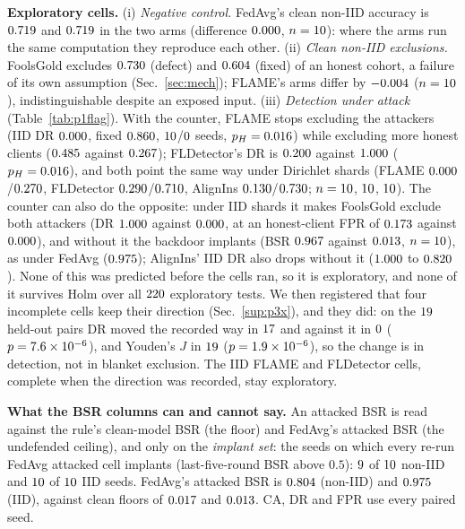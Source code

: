 \documentclass[journal]{IEEEtran}
\begin{document}
\textbf{Exploratory cells.}
(i) \emph{Negative control.} FedAvg's clean non-IID accuracy is
$0.719$ and $0.719$ in the two arms (difference
$0.000$, $n=10$): where the arms run the same
computation they reproduce each other.
(ii) \emph{Clean non-IID exclusions.} FoolsGold excludes $0.730$
(defect) and $0.604$ (fixed) of an honest cohort, a failure of its
own assumption (Sec.~\ref{sec:mech}); FLAME's arms differ by $-0.004$
($n=10$), indistinguishable despite an exposed input.
(iii) \emph{Detection under attack} (Table~\ref{tab:p1flag}). With the counter, FLAME
stops excluding the attackers (IID DR $0.000$, fixed
$0.860$, $10$/$0$ seeds, $p_H=0.016$)
while excluding more honest clients ($0.485$ against
$0.267$); FLDetector's DR is $0.200$ against
$1.000$ ($p_H=0.016$), and both point the same way
under Dirichlet shards (FLAME $0.000$/$0.270$,
FLDetector $0.290$/$0.710$, AlignIns
$0.130$/$0.730$; $n=10$, $10$, $10$). The counter can also do the
opposite: under IID shards it makes FoolsGold exclude both attackers (DR
$1.000$ against $0.000$, at an honest-client FPR of
$0.173$ against $0.000$), and without it the backdoor
implants (BSR $0.967$ against $0.013$,
$n=10$), as under FedAvg ($0.975$); AlignIns' IID DR
also drops without it ($1.000$ to $0.820$). None of
this was predicted before the cells ran, so it is exploratory, and none of it survives Holm over all
$220$ exploratory tests. We then registered
that four incomplete cells keep their direction (Sec.~\ref{sup:p3x}), and they did:
on the $19$ held-out pairs DR moved the recorded way in $17$ and against
it in $0$ ($p=7.6\times10^{-6}$), and Youden's $J$ in $19$ ($p=1.9\times10^{-6}$), so
the change is in detection, not in blanket exclusion. The IID FLAME and FLDetector
cells, complete when the direction was recorded, stay exploratory.

\textbf{What the BSR columns can and cannot say.} An attacked BSR is read against
the rule's clean-model BSR (the floor) and FedAvg's attacked BSR (the undefended
ceiling), and only on the \emph{implant set}: the seeds on which every re-run
FedAvg attacked cell implants (last-five-round BSR above $0.5$):
$9$ of $10$ non-IID and $10$ of
$10$ IID seeds. FedAvg's attacked BSR is $0.804$
(non-IID) and $0.975$ (IID), against clean floors of
$0.017$ and $0.013$. CA, DR and FPR use every
paired seed.
\end{document}
